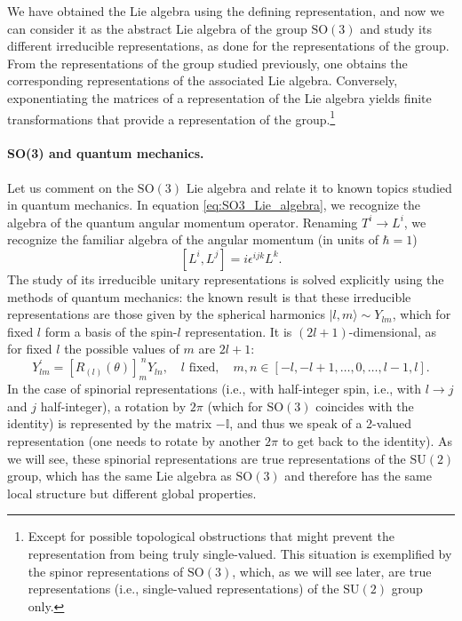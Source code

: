 We have obtained the Lie algebra using the defining representation, and now we can consider it as the abstract Lie algebra of the group $\mathrm{SO}(3)$ and study its different irreducible representations, as done for the representations of the group. From the representations of the group studied previously, one obtains the corresponding representations of the associated Lie algebra. Conversely, exponentiating the matrices of a representation of the Lie algebra yields finite transformations that provide a representation of the group.\footnote{Except for possible topological obstructions that might prevent the representation from being truly single-valued. This situation is exemplified by the spinor representations of $\mathrm{SO}(3)$, which, as we will see later, are true representations (i.e., single-valued representations) of the $\mathrm{SU}(2)$ group only.}

\paragraph{SO(3) and quantum mechanics.}
Let us comment on the $\mathrm{SO}(3)$ Lie algebra and relate it to known topics studied in quantum mechanics. In equation \eqref{eq:SO3_Lie_algebra}, we recognize the algebra of the quantum angular momentum operator. Renaming $T^i \rightarrow L^i$, we recognize the familiar algebra of the angular momentum (in units of $\hbar = 1$)
\[
    [L^i, L^j] = i \epsilon^{ijk} L^k.
\]
The study of its irreducible unitary representations is solved explicitly using the methods of quantum mechanics: the known result is that these irreducible representations are those given by the spherical harmonics $|l, m\rangle \sim Y_{lm}$, which for fixed $l$ form a basis of the spin-$l$ representation. It is $(2l + 1)$-dimensional, as for fixed $l$ the possible values of $m$ are $2l + 1$:
\[
    Y^{\prime}_{lm} = [R_{(l)}(\theta)]_{m}^{\ n} Y_{ln}, \quad l \text{ fixed}, \quad m, n \in [-l, -l+1, \dots, 0, \dots, l-1, l].
\]
In the case of spinorial representations (i.e., with half-integer spin, i.e., with $l \rightarrow j$ and $j$ half-integer), a rotation by $2\pi$ (which for $\mathrm{SO}(3)$ coincides with the identity) is represented by the matrix $-\mathbb{I}$, and thus we speak of a 2-valued representation (one needs to rotate by another $2\pi$ to get back to the identity). As we will see, these spinorial representations are true representations of the $\mathrm{SU}(2)$ group, which has the same Lie algebra as $\mathrm{SO}(3)$ and therefore has the same local structure but different global properties.

